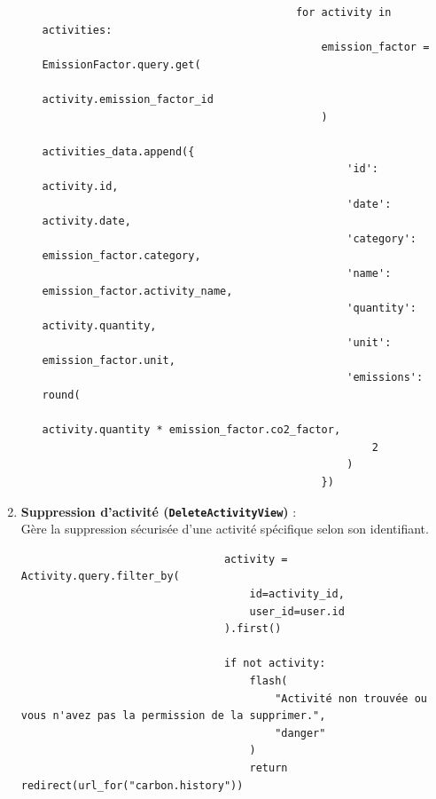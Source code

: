 \documentclass[a4paper,11pt]{article}
\begin{document}
\begin{enumerate}
\begin{itemize}
                                \begin{tcolorbox}[colback=lightgray!6, colframe=black, left=-60mm, right=5mm, top=2mm, bottom=0mm, boxrule=0.1mm]
                                    \begin{verbatim}
                                        for activity in activities:
                                            emission_factor = EmissionFactor.query.get(
                                                activity.emission_factor_id
                                            )
                                            activities_data.append({
                                                'id': activity.id,
                                                'date': activity.date,
                                                'category': emission_factor.category,
                                                'name': emission_factor.activity_name,
                                                'quantity': activity.quantity,
                                                'unit': emission_factor.unit,
                                                'emissions': round(
                                                    activity.quantity * emission_factor.co2_factor,
                                                    2
                                                )
                                            })
                                    \end{verbatim}
                                \end{tcolorbox}
                        \end{itemize}

                    \item \textbf{Suppression d'activité (\texttt{DeleteActivityView})} :\\
                        Gère la suppression sécurisée d'une activité spécifique selon son identifiant.

                        \begin{tcolorbox}[colback=lightgray!6, colframe=black, left=-60mm, right=5mm, top=2mm, bottom=0mm, boxrule=0.1mm]
                            \begin{verbatim}
                                activity = Activity.query.filter_by(
                                    id=activity_id, 
                                    user_id=user.id
                                ).first()

                                if not activity:
                                    flash(
                                        "Activité non trouvée ou vous n'avez pas la permission de la supprimer.", 
                                        "danger"
                                    )
                                    return redirect(url_for("carbon.history"))
                            \end{verbatim}
                        \end{tcolorbox}


\end{enumerate}
\end{document}
